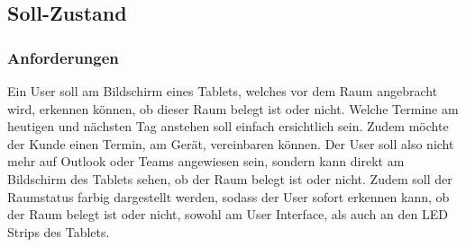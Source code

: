 \pagebreak
\subsection{Soll-Zustand}\label{sec:soll-zustand}

\subsubsection{Anforderungen}\label{subsec:anforderungen}
Ein User soll am Bildschirm eines Tablets, welches vor dem Raum angebracht wird, erkennen können, ob dieser Raum belegt ist oder nicht.
Welche Termine am heutigen und nächsten Tag anstehen soll einfach ersichtlich sein.
Zudem möchte der Kunde einen Termin, am Gerät, vereinbaren können.
Der User soll also nicht mehr auf Outlook oder Teams angewiesen sein, sondern kann direkt am Bildschirm des Tablets sehen, ob der Raum belegt ist oder nicht.
Zudem soll der Raumstatus farbig dargestellt werden, sodass der User sofort erkennen kann, ob der Raum belegt ist oder nicht, sowohl am User Interface, als auch an den LED Strips des Tablets.
